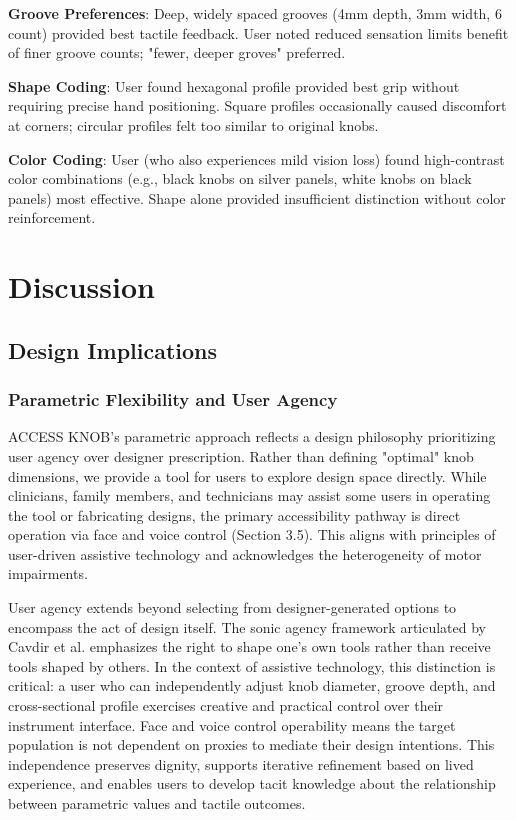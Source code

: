 \documentclass[sigconf]{nimeart}
\begin{document}
\textbf{Groove Preferences}: Deep, widely spaced grooves (4mm depth, 3mm width, 6 count) provided best tactile feedback. User noted reduced sensation limits benefit of finer groove counts; "fewer, deeper groves" preferred.

\textbf{Shape Coding}: User found hexagonal profile provided best grip without requiring precise hand positioning. Square profiles occasionally caused discomfort at corners; circular profiles felt too similar to original knobs.

\textbf{Color Coding}: User (who also experiences mild vision loss) found high-contrast color combinations (e.g., black knobs on silver panels, white knobs on black panels) most effective. Shape alone provided insufficient distinction without color reinforcement.


\section{Discussion}

\subsection{Design Implications}

\subsubsection{Parametric Flexibility and User Agency}

ACCESS KNOB's parametric approach reflects a design philosophy prioritizing user agency over designer prescription. Rather than defining "optimal" knob dimensions, we provide a tool for users to explore design space directly. While clinicians, family members, and technicians may assist some users in operating the tool or fabricating designs, the primary accessibility pathway is direct operation via face and voice control (Section 3.5). This aligns with principles of user-driven assistive technology\cite{hofmann2020living} and acknowledges the heterogeneity of motor impairments.

User agency extends beyond selecting from designer-generated options to encompass the act of design itself. The sonic agency framework articulated by Cavdir et al.\cite{cavdir2024sonic} emphasizes the right to shape one's own tools rather than receive tools shaped by others. In the context of assistive technology, this distinction is critical: a user who can independently adjust knob diameter, groove depth, and cross-sectional profile exercises creative and practical control over their instrument interface. Face and voice control operability means the target population is not dependent on proxies to mediate their design intentions. This independence preserves dignity, supports iterative refinement based on lived experience, and enables users to develop tacit knowledge about the relationship between parametric values and tactile outcomes.
\end{document}
